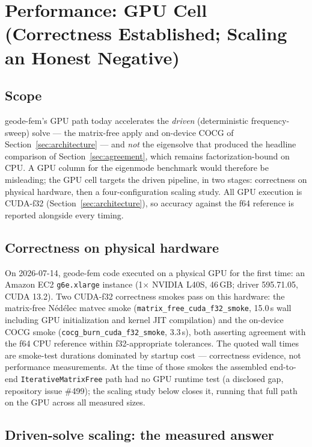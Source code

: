 \documentclass{anvil-paper}
\begin{document}
\section{Performance: GPU Cell (Correctness Established; Scaling an
Honest Negative)}
\label{sec:perf-gpu}

\subsection{Scope}

geode-fem's GPU path today accelerates the \emph{driven} (deterministic
frequency-sweep) solve --- the matrix-free apply and on-device COCG of
Section~\ref{sec:architecture} --- and \emph{not} the eigensolve that
produced the headline comparison of Section~\ref{sec:agreement}, which
remains factorization-bound on CPU. A GPU column for the eigenmode
benchmark would therefore be misleading; the GPU cell targets the driven
pipeline, in two stages: correctness on physical hardware, then a
four-configuration scaling study. All GPU execution is CUDA-f32
(Section~\ref{sec:architecture}), so accuracy against the f64 reference is
reported alongside every timing.

\subsection{Correctness on physical hardware}

On 2026-07-14, geode-fem code executed on a physical GPU for the first
time: an Amazon EC2 \texttt{g6e.xlarge} instance (1$\times$ NVIDIA L40S,
46\,GB; driver 595.71.05, CUDA 13.2). Two CUDA-f32 correctness smokes pass
on this hardware: the matrix-free N\'ed\'elec matvec smoke
(\texttt{matrix\_free\_cuda\_f32\_smoke}, 15.0\,s wall including GPU
initialization and kernel JIT compilation) and the on-device COCG smoke
(\texttt{cocg\_burn\_cuda\_f32\_smoke}, 3.3\,s), both asserting agreement
with the f64 CPU reference within f32-appropriate tolerances. The quoted
wall times are smoke-test durations dominated by startup cost ---
correctness evidence, not performance measurements. At the time of those
smokes the assembled end-to-end \texttt{IterativeMatrixFree} path had no
GPU runtime test (a disclosed gap, repository issue \#499); the scaling
study below closes it, running that full path on the GPU across all
measured sizes.

\subsection{Driven-solve scaling: the measured answer}
\end{document}
